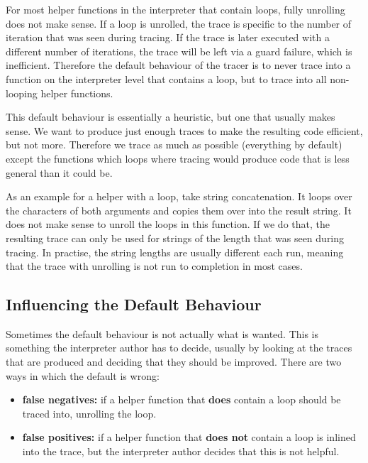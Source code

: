 \documentclass{sig-alternate}
\begin{document}
For most helper functions in the interpreter that contain loops, fully
unrolling does not make sense. If a loop is unrolled, the trace is specific to
the number of iteration that was seen during tracing. If the trace is later
executed with a different number of iterations, the trace will be left via a
guard failure, which is inefficient. Therefore the default behaviour of the
tracer is to never trace into a function on the interpreter level that contains
a loop, but to trace into all non-looping helper functions.

This default behaviour is essentially a heuristic, but one that usually makes
sense. We want to produce just enough traces to make the resulting code
efficient, but not more. Therefore we trace as much as possible (everything by
default) except the functions which loops where tracing would produce code that
is less general than it could be.

As an example for a helper with a loop, take string concatenation. It loops over
the characters of both arguments and copies them over into the result string. It
does not make sense to unroll the loops in this function. If we do that,
the resulting trace can only be used for strings of the length that was seen
during tracing. In practise, the string lengths are usually different each run,
meaning that the trace with unrolling is not run to completion in most cases.



\subsection{Influencing the Default Behaviour}

Sometimes the default behaviour is not actually what is wanted. This is
something the interpreter author has to decide, usually by looking at the traces
that are produced and deciding that they should be improved. There are two ways
in which the default is wrong:
%
\begin{itemize}

\item \textbf{false negatives:} if a helper function that \textbf{does} contain a loop should
be traced into, unrolling the loop.

\item \textbf{false positives:} if a helper function that \textbf{does not} contain a loop is
inlined into the trace, but the interpreter author decides that this is not
helpful.

\end{itemize}
\end{document}
